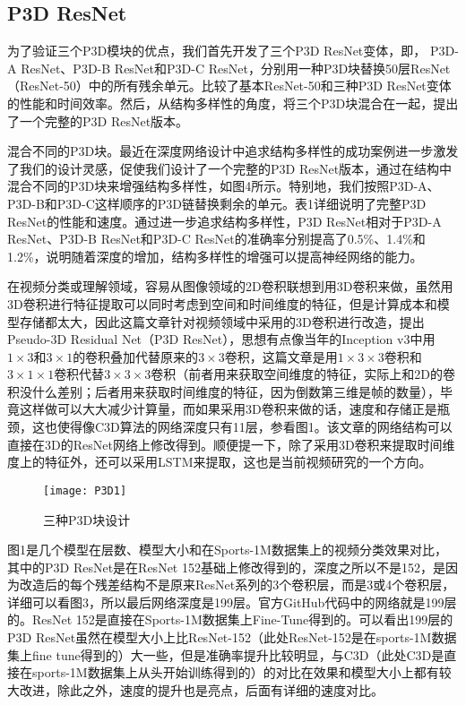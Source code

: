 \subsection{P3D ResNet}

为了验证三个P3D模块的优点，我们首先开发了三个P3D ResNet变体，即， P3D-A ResNet、P3D-B ResNet和P3D-C ResNet，分别用一种P3D块替换50层ResNet （ResNet-50）中的所有残余单元。比较了基本ResNet-50和三种P3D ResNet变体的性能和时间效率。然后，从结构多样性的角度，将三个P3D块混合在一起，提出了一个完整的P3D ResNet版本。

混合不同的P3D块。最近在深度网络设计中追求结构多样性的成功案例进一步激发了我们的设计灵感，促使我们设计了一个完整的P3D ResNet版本，通过在结构中混合不同的P3D块来增强结构多样性，如图4所示。特别地，我们按照P3D-A、P3D-B和P3D-C这样顺序的P3D链替换剩余的单元。表1详细说明了完整P3D ResNet的性能和速度。通过进一步追求结构多样性，P3D ResNet相对于P3D-A ResNet、P3D-B ResNet和P3D-C ResNet的准确率分别提高了0.5\%、1.4\%和1.2\%，说明随着深度的增加，结构多样性的增强可以提高神经网络的能力。

在视频分类或理解领域，容易从图像领域的2D卷积联想到用3D卷积来做，虽然用3D卷积进行特征提取可以同时考虑到空间和时间维度的特征，但是计算成本和模型存储都太大，因此这篇文章针对视频领域中采用的3D卷积进行改造，提出Pseudo-3D Residual Net（P3D ResNet），思想有点像当年的Inception v3中用$1\times3$和$3\times1$的卷积叠加代替原来的$3\times3$卷积，这篇文章是用$1\times3\times3$卷积和$3\times1\times1$卷积代替$3\times3\times3$卷积（前者用来获取空间维度的特征，实际上和2D的卷积没什么差别；后者用来获取时间维度的特征，因为倒数第三维是帧的数量），毕竟这样做可以大大减少计算量，而如果采用3D卷积来做的话，速度和存储正是瓶颈，这也使得像C3D算法的网络深度只有11层，参看图1。该文章的网络结构可以直接在3D的ResNet网络上修改得到。顺便提一下，除了采用3D卷积来提取时间维度上的特征外，还可以采用LSTM来提取，这也是当前视频研究的一个方向。

\begin{figure}[!htbp]
\centering
\texttt{[image: P3D1]}
\caption{三种P3D块设计}
\label{fig22}
\end{figure}

图1是几个模型在层数、模型大小和在Sports-1M数据集上的视频分类效果对比，其中的P3D ResNet是在ResNet 152基础上修改得到的，深度之所以不是152，是因为改造后的每个残差结构不是原来ResNet系列的3个卷积层，而是3或4个卷积层，详细可以看图3，所以最后网络深度是199层。官方GitHub代码中的网络就是199层的。ResNet 152是直接在Sports-1M数据集上Fine-Tune得到的。可以看出199层的P3D ResNet虽然在模型大小上比ResNet-152（此处ResNet-152是在sports-1M数据集上fine tune得到的）大一些，但是准确率提升比较明显，与C3D（此处C3D是直接在sports-1M数据集上从头开始训练得到的）的对比在效果和模型大小上都有较大改进，除此之外，速度的提升也是亮点，后面有详细的速度对比。

